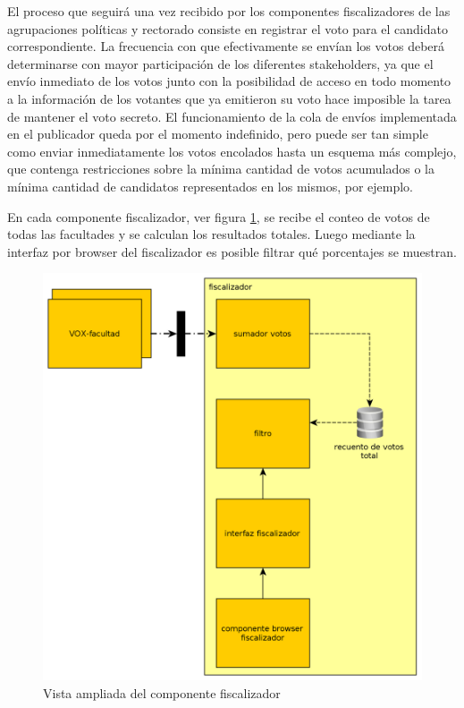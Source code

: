 El proceso que seguirá una vez recibido por los componentes fiscalizadores de las agrupaciones políticas y rectorado consiste en registrar el voto para el candidato correspondiente. La frecuencia con que efectivamente se envían los votos deberá determinarse con mayor participación de los diferentes stakeholders, ya que el envío inmediato de los votos junto con la posibilidad de acceso en todo momento a la información de los votantes que ya emitieron su voto hace imposible la tarea de mantener el voto secreto. El funcionamiento de la cola de envíos implementada en el publicador queda por el momento indefinido, pero puede ser tan simple como enviar inmediatamente los votos encolados hasta un esquema más complejo, que contenga restricciones sobre la mínima cantidad de votos acumulados o la mínima cantidad de candidatos representados en los mismos, por ejemplo.

En cada componente fiscalizador,  ver figura \ref{fig:fiscalizador}, se recibe el conteo de votos de todas las facultades y se calculan los resultados totales. Luego mediante la interfaz por browser del fiscalizador es posible filtrar qué porcentajes se muestran.

\begin{figure}[H]
	\begin{center}
		\includegraphics[scale=0.26]{../diagramas/fiscalizador.png}
	\end{center} 
	\caption{Vista ampliada del componente fiscalizador}	
	\label{fig:fiscalizador}
\end{figure} 


